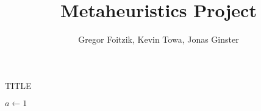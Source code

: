 \documentclass[12pt]{article}
\title{Metaheuristics Project}
\author{Gregor Foitzik, Kevin Towa, Jonas Ginster}
\begin{document}
\maketitle
{}
\begin{algorithm}
    \caption{TITLE}
    \begin{algorithmic}[1]
        \State $a\leftarrow 1$
    \end{algorithmic}
\end{algorithm}
\end{document}
